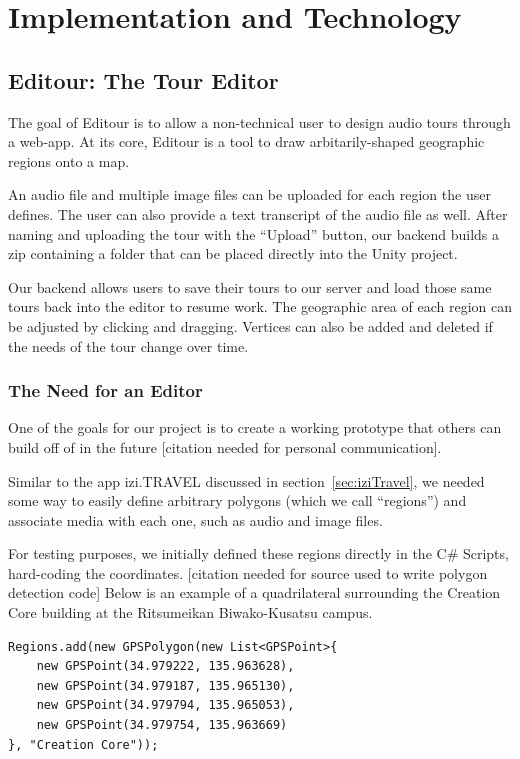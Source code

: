 \documentclass[a4paper, 10pt, american, titlepage]{article}
\begin{document}
\newpage

\section{Implementation and Technology}
\label{sec:implementationAndTechnology}

\subsection{Editour: The Tour Editor}
\label{sec:editour}

The goal of Editour is to allow a non-technical user to design audio tours
through a web-app. At its core, Editour is a tool to draw arbitarily-shaped
geographic regions onto a map. 

An audio file and multiple image files can be uploaded for each region the user
defines. The user can also provide a text transcript of the audio file as well.
After naming and uploading the tour with the ``Upload'' button, our backend
builds a zip containing a folder that can be placed directly into the Unity
project.

Our backend allows users to save their tours to our server and load those same
tours back into the editor to resume work.  The geographic area of each region
can be adjusted by clicking and dragging. Vertices can also be added and
deleted if the needs of the tour change over time.

\subsubsection{The Need for an Editor}

One of the goals for our project is to create a working prototype that others
can build off of in the future [citation needed for personal communication].

Similar to the app izi.TRAVEL discussed in section~\ref{sec:iziTravel}, we
needed some way to easily define arbitrary polygons (which we call ``regions'')
and associate media with each one, such as audio and image files.

For testing purposes, we initially defined these regions directly in the C\#
Scripts, hard-coding the coordinates. [citation needed for source used to
write polygon detection code] Below is an example of a quadrilateral
surrounding the Creation Core building at the Ritsumeikan Biwako-Kusatsu
campus.

\begin{verbatim}
Regions.add(new GPSPolygon(new List<GPSPoint>{
    new GPSPoint(34.979222, 135.963628),
    new GPSPoint(34.979187, 135.965130),
    new GPSPoint(34.979794, 135.965053),
    new GPSPoint(34.979754, 135.963669)
}, "Creation Core"));
\end{verbatim}
\end{document}
